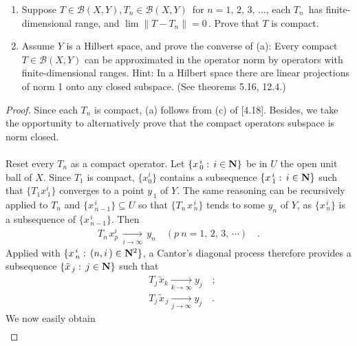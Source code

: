 %
{ \CMUCS 
\begin{enumerate}
\renewcommand{\labelenumi}{(\alph{enumi})}
\item Suppose $T\in \mathscr{B}(X,Y), T_n \in  \mathscr{B}(X,Y)\, $ for $n=1,\, 2, \, 3,\, \dots$, each $T_n\,$ has finite-dimensional range, and $\lim \| T-T_n\|=0\, $. Prove that $T$ is compact.
\item Assume $Y$ is a Hilbert space, and prove the converse of (a): Every compact $T\in  \mathscr{B}(X,Y)$ can be approximated in the operator norm by operators with finite-dimensional ranges. Hint: In a Hilbert space there are linear projections of norm 1 onto any closed subspace. (See theorems 5.16, 12.4.)
\end{enumerate}
}
\begin{proof} Since each $T_n$ is compact, (a) follows from (c) of [4.18]. Besides, we take the opportunity to alternatively prove that the compact operators subspace is norm closed.\\
\\
Reset every $T_n$ as a compact operator. Let $\{x_{\,0}^{\,i}:\, i\in {\mathbf N}\}$ be in $U$ the open unit ball of $X$. Since $T_1$ is compact, $\{x^i_0\}$ contains a subsequence $\{x^{\,i}_{\,1}:\, i\in {\mathbf N}\}$ such that $\{T_1x^{i}_{\,1}\}$ converges to a point $y_{\,1}$ of $Y$. The same reasoning can be recursively applied to $T_{n}$ and $\{x^{\,i}_{\, n-1}\}\subseteq U$ so that $\{T_{n\,}x^{\,i}_{\, n}\}$ tends to some $y_{n}$ of $Y$, as $\{x^{\,i}_{\, n}\}$ is a subsequence of $\{x^{\,i}_{\,n-1}\}$. Then
\begin{align}\label{4_13_a_0}
T_{n\,} x^{i}_p \,\underset{i\to \infty}{\longrightarrow}\,y_n\quad (p\> n=1,\, 2,\, 3,\, \dotsb )\quad .
\end{align}
Applied with $\{x^{\,i}_{\,n}:\, (n,i\,)\in{\mathbf N}^2\}$, a Cantor's diagonal process therefore provides a subsequence $\{\tilde{x}_{\, j}:\, j\in {\mathbf N}\} $ such that
\begin{align}\label{4_13_a_1}
&T_{j\,} \tilde{x}_k \underset{k\to \infty}{\longrightarrow}y_{j}\quad ;\\
&T_{j\,} \tilde{x}_{\, j} \underset{j\to \infty}{\longrightarrow} y_{j}\quad .
\end{align}
We now easily obtain
\begin{align}\label{4_13_a_3}

\end{align}
\end{proof}
